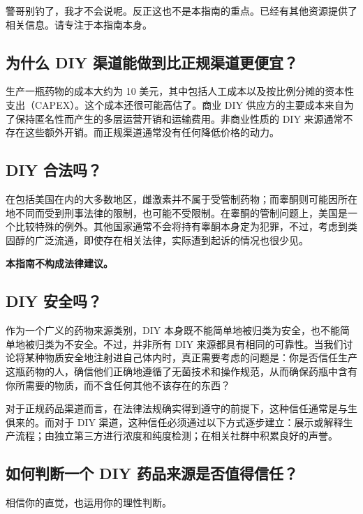 \documentclass{article}
\begin{document}
警哥别钓了，我才不会说呢。反正这也不是本指南的重点。已经有其他资源提供了相关信息。请专注于本指南本身。

\subsection{为什么 DIY 渠道能做到比正规渠道更便宜？}

生产一瓶药物的成本大约为 10 美元，其中包括人工成本以及按比例分摊的资本性支出（CAPEX）。这个成本还很可能高估了。商业 DIY 供应方的主要成本来自为了保持匿名性而产生的多层运营开销和运输费用。非商业性质的 DIY 来源通常不存在这些额外开销。而正规渠道通常没有任何降低价格的动力。

\subsection{DIY 合法吗？}\label{6-11}

在包括美国在内的大多数地区，雌激素并不属于受管制药物；而睾酮则可能因所在地不同而受到刑事法律的限制，也可能不受限制。在睾酮的管制问题上，美国是一个比较特殊的例外。其他国家通常不会将持有睾酮本身定为犯罪，不过，考虑到类固醇的广泛流通，即使存在相关法律，实际遭到起诉的情况也很少见。

\textbf{本指南不构成法律建议。}

\subsection{DIY 安全吗？}

作为一个广义的药物来源类别，DIY 本身既不能简单地被归类为安全，也不能简单地被归类为不安全。不过，并非所有 DIY 来源都具有相同的可靠性。当我们讨论将某种物质安全地注射进自己体内时，真正需要考虑的问题是：你是否信任生产这瓶药物的人，确信他们正确地遵循了无菌技术和操作规范，从而确保药瓶中含有你所需要的物质，而不含任何其他不该存在的东西？

对于正规药品渠道而言，在法律法规确实得到遵守的前提下，这种信任通常是与生俱来的。而对于 DIY 渠道，这种信任必须通过以下方式逐步建立：展示或解释生产流程；由独立第三方进行浓度和纯度检测；在相关社群中积累良好的声誉。

\subsection{如何判断一个 DIY 药品来源是否值得信任？}

相信你的直觉，也运用你的理性判断。
\end{document}
